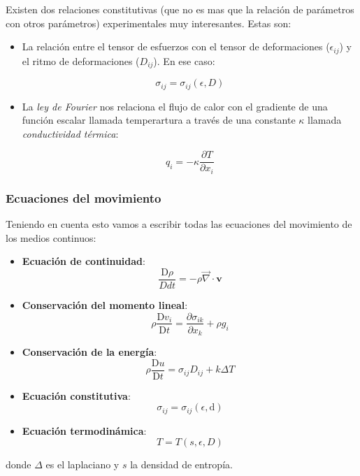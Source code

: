 \documentclass[12pt,a4paper]{article}
\numberwithin{equation}{section}
\numberwithin{figure}{section}
\newcommand{\parciales}[2]{\frac{\partial #1}{\partial #2}}
\newcommand{\D}{\mathrm{d}}
\newcommand{\Dd}{\mathrm{D}}
\newcommand{\vn}{\mathbf{v}}
\begin{document}
Existen dos relaciones constitutivas (que no es mas que la relación de parámetros con otros parámetros) experimentales muy interesantes. Estas son:

\begin{itemize}\item La relación entre el tensor de esfuerzos con el tensor de deformaciones ($\epsilon_{ij}$) y el ritmo de deformaciones ($D_{ij}$). En ese caso:

\begin{equation}
\sigma_{ij} = \sigma_{ij} (\epsilon,D)
\end{equation}
\item La \textit{ley de Fourier} nos relaciona el flujo de calor con el gradiente de una función escalar llamada temperartura a través de una constante $\kappa$ llamada \textit{conductividad térmica}:

\begin{equation}
q_i = - \kappa \parciales{T}{x_i}
\end{equation}
\end{itemize}

\subsubsection{Ecuaciones del movimiento}

Teniendo en cuenta esto vamos a escribir todas las ecuaciones del movimiento de los medios continuos:

\begin{itemize}
\item \textbf{Ecuación de continuidad}:
\begin{equation}
\dfrac{\Dd \rho}{Dd t} = - \rho \vec{\nabla} \cdot \vn
\end{equation}
\item \textbf{Conservación del momento lineal}:
\begin{equation}
\rho \dfrac{\Dd v_i}{\Dd t} = \parciales{\sigma_{ik}}{x_k} + \rho g_i
\end{equation}
\item \textbf{Conservación de la energía}:
\begin{equation}
\rho \dfrac{\Dd u}{\Dd t} = \sigma_{ij} D_{ij} + k \Delta T
\end{equation}
\item \textbf{Ecuación constitutiva}:
\begin{equation}
\sigma_{ij} = \sigma_{ij} ( \epsilon , \D)
\end{equation}
\item \textbf{Ecuación termodinámica}:
\begin{equation}
T = T (s,\epsilon ,D)
\end{equation}
\end{itemize}
donde $\Delta$ es el laplaciano y $s$ la densidad de entropía.
\end{document}
